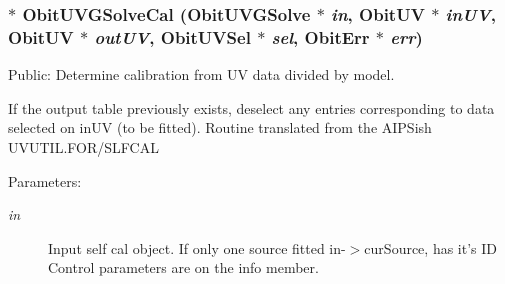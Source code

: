 \subsubsection{$\ast$ Obit\-UVGSolve\-Cal ({\bf Obit\-UVGSolve} $\ast$ {\em in}, {\bf Obit\-UV} $\ast$ {\em in\-UV}, {\bf Obit\-UV} $\ast$ {\em out\-UV}, {\bf Obit\-UVSel} $\ast$ {\em sel}, {\bf Obit\-Err} $\ast$ {\em err})}\label{ObitUVGSolve_8h_a10}


Public: Determine calibration from UV data divided by model. 

If the output table previously exists, deselect any entries corresponding to data selected on in\-UV (to be fitted). Routine translated from the AIPSish UVUTIL.FOR/SLFCAL \begin{Desc}
\item[Parameters:]
\begin{description}
\item[{\em in}]Input self cal object. If only one source fitted in-$>$cur\-Source, has it's ID Control parameters are on the info member. \begin{itemize}

\end{itemize}
\end{description}
\end{Desc}
